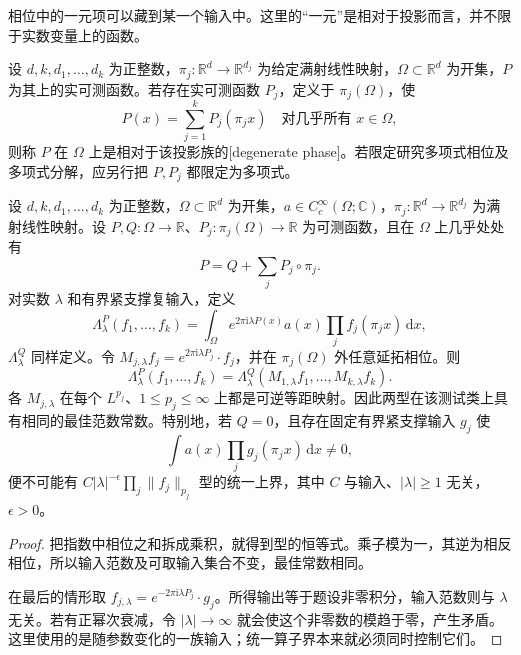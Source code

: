 相位中的一元项可以藏到某一个输入中。这里的“一元”是相对于投影而言，并不限于实数变量上的函数。

\begin{definition}[相对于投影族的退化相位]\label{b2:def:25-degenerate-phase}
设 \(d,k,d_1,\ldots,d_k\) 为正整数，\(\pi_j:\mathbb R^d\to\mathbb R^{d_j}\) 为给定满射线性映射，\(\Omega\subset\mathbb R^d\) 为开集，\(P\) 为其上的实可测函数。若存在实可测函数 \(P_j\)，定义于 \(\pi_j(\Omega)\)，使
\[
 P(x)=\sum_{j=1}^k P_j(\pi_jx)
 \quad\text{对几乎所有 }x\in\Omega,
\]
则称 \(P\) 在 \(\Omega\) 上是相对于该投影族的[degenerate phase]。若限定研究多项式相位及多项式分解，应另行把 \(P,P_j\) 都限定为多项式。
\end{definition}

\begin{proposition}[可吸收相位与统一衰减]\label{b2:prop:25-phase-absorption}
设 \(d,k,d_1,\ldots,d_k\) 为正整数，\(\Omega\subset\mathbb R^d\) 为开集，\(a\in C_c^\infty(\Omega;\mathbb C)\)，\(\pi_j:\mathbb R^d\to\mathbb R^{d_j}\) 为满射线性映射。设 \(P,Q:\Omega\to\mathbb R\)、\(P_j:\pi_j(\Omega)\to\mathbb R\) 为可测函数，且在 \(\Omega\) 上几乎处处有
\[
 P=Q+\sum_jP_j\circ\pi_j.
\]
对实数 \(\lambda\) 和有界紧支撑复输入，定义
\[
 \Lambda_\lambda^P(f_1,\ldots,f_k)
 =\int_\Omega e^{2\pi\mathrm i\lambda P(x)}
                  a(x)\prod_jf_j(\pi_jx)\,\mathrm dx,
\]
\(\Lambda_\lambda^Q\) 同样定义。令
\(M_{j,\lambda}f_j=e^{2\pi\mathrm i\lambda P_j}\cdot f_j\)，并在 \(\pi_j(\Omega)\) 外任意延拓相位。则
\[
 \Lambda_\lambda^P(f_1,\ldots,f_k)
 =\Lambda_\lambda^Q(M_{1,\lambda}f_1,\ldots,M_{k,\lambda}f_k).
\]
各 \(M_{j,\lambda}\) 在每个 \(L^{p_j}\)、\(1\leq p_j\leq\infty\) 上都是可逆等距映射。因此两型在该测试类上具有相同的最佳范数常数。特别地，若 \(Q=0\)，且存在固定有界紧支撑输入 \(g_j\) 使
\[
 \int a(x)\prod_jg_j(\pi_jx)\,\mathrm dx\ne0,
\]
便不可能有 \(C|\lambda|^{-\epsilon}\prod_j\|f_j\|_{p_j}\) 型的统一上界，其中 \(C\) 与输入、\(|\lambda|\geq1\) 无关，\(\epsilon>0\)。
\end{proposition}
\begin{proof}
把指数中相位之和拆成乘积，就得到型的恒等式。乘子模为一，其逆为相反相位，所以输入范数及可取输入集合不变，最佳常数相同。

在最后的情形取 \(f_{j,\lambda}=e^{-2\pi\mathrm i\lambda P_j}\cdot g_j\)。所得输出等于题设非零积分，输入范数则与 \(\lambda\) 无关。若有正幂次衰减，令 \(|\lambda|\to\infty\) 就会使这个非零数的模趋于零，产生矛盾。这里使用的是随参数变化的一族输入；统一算子界本来就必须同时控制它们。
\end{proof}

